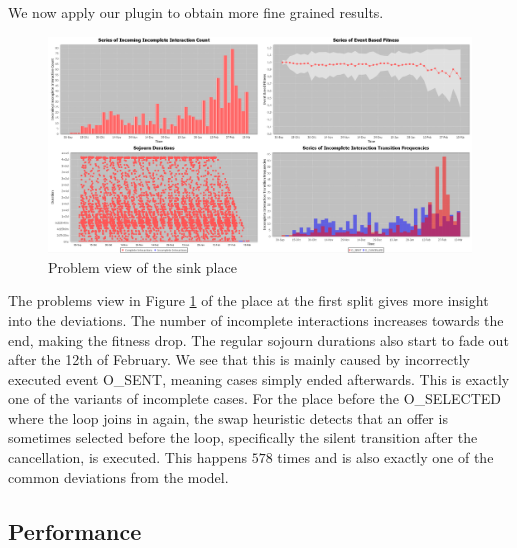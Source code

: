 We now apply our plugin to obtain more fine grained results.
\begin{figure}[H]
    \centering
    \includegraphics[width=\textwidth]{figures/evaluation/splitplace_problems.png}
    \caption{Problem view of the sink place}
    \label{fig:splitplaceproblems}
\end{figure}
The problems view in Figure \ref{fig:splitplaceproblems} of the place at the first split gives more insight into the deviations. The number of incomplete interactions increases towards the end, making the fitness drop. The regular sojourn durations also start to fade out after the 12th of February. We see that this is mainly caused by incorrectly executed event \textsc{O\_SENT}, meaning cases simply ended afterwards. This is exactly one of the variants of incomplete cases.
For the place before the \textsc{O\_SELECTED} where the loop joins in again, the swap heuristic detects that an offer is sometimes selected before the loop, specifically the silent transition after the cancellation, is executed. This happens $578$ times and is also exactly one of the common deviations from the model.

\subsection*{Performance}

